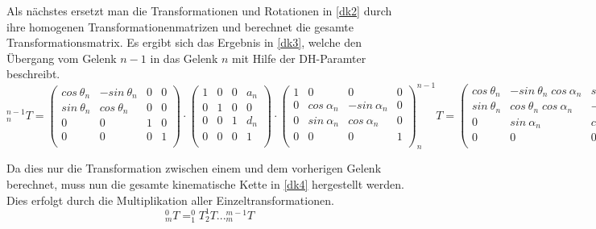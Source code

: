 Als nächstes ersetzt man die Transformationen und Rotationen in \autoref{dk2} durch ihre homogenen Transformationenmatrizen und berechnet die gesamte Transformationsmatrix. Es ergibt sich das Ergebnis in \autoref{dk3}, welche den Übergang vom Gelenk $n - 1$ in das Gelenk $n$ mit Hilfe der DH-Paramter beschreibt.
\begin{equation}
  ^{n-1}_{n}T = \begin{pmatrix}
    cos\: \theta_n & -sin\: \theta_n  & 0 & 0\\ 
    sin\: \theta_n & cos\: \theta_n   & 0 & 0\\ 
    0             & 0               & 1 & 0\\ 
    0             & 0               & 0 & 1\\
\end{pmatrix} \cdot
\begin{pmatrix}
  1 & 0 & 0 & a_n\\ 
  0 & 1 & 0 & 0\\ 
  0 & 0 & 1 & d_n\\ 
  0 & 0 & 0 & 1\\
\end{pmatrix} \cdot \begin{pmatrix}
  1 & 0 & 0 & 0\\ 
  0 & cos\: \alpha_n & -sin\: \alpha_n & 0\\ 
  0 & sin\: \alpha_n & cos\: \alpha_n & 0\\ 
  0 & 0 & 0 & 1\\
\end{pmatrix}

^{n-1}_{n}T = \begin{pmatrix}
  cos\: \theta_n  & -sin\: \theta_n\; cos\: \alpha_n    & sin\: \theta_n\; sin\: \alpha_n & a_n\: cos\: \theta_n\\ 
  sin\: \theta_n  & cos\: \theta_n\; cos\: \alpha_n     & -cos\: \theta_n\; sin\: \alpha_n & a_n\: sin\: \theta_n\\ 
  0               & sin\: \alpha_n                & cos\: \alpha_n & d_n\\ 
  0               & 0                             & 0 & 1\\
\end{pmatrix}
\label{dk3}
\end{equation}

Da dies nur die Transformation zwischen einem und dem vorherigen Gelenk berechnet, muss nun die gesamte kinematische Kette in \autoref{dk4} hergestellt werden. Dies erfolgt durch die Multiplikation aller Einzeltransformationen.
\begin{equation}
  _{m}^{0}T = ^{0}_{1}T^{1}_{2}T...^{m-1}_{m}T
\label{dk4}
\end{equation}


